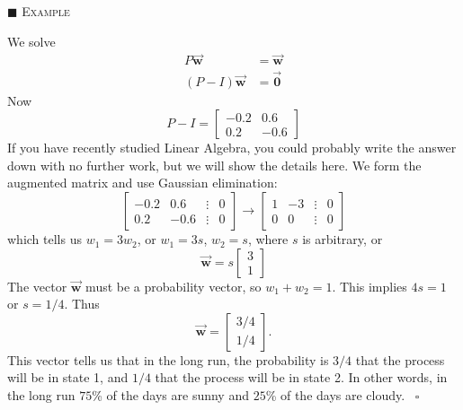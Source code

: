 \documentclass[reqno]{immbook}
\newcommand{\BW}{\vec{\textbf{w}}}
\newcommand{\BZero}{\vec{\textbf{0}}}  %
\numberwithin{equation}{chapter}
\numberwithin{question}{section}
\numberwithin{theorem}{chapter}
\numberwithin{figure}{chapter}
\theoremstyle{definition}
\newenvironment{xexample}%
{%

\medskip\noindent\addtocounter{example}{1}$\blacksquare$ \textsc{Example \theexample}\hspace*{1em}%
}%
{%
~\hfill$\square$

\medskip
}
\begin{document}
\begin{xexample}
We solve
\begin{equation}
\begin{split}
   P\BW & = \BW \\
   (P-I)\BW & = \BZero
\end{split}
\end{equation}
Now
\begin{equation}
  P-I = \begin{bmatrix}
            -0.2 &  0.6 \\
	     0.2 & -0.6
        \end{bmatrix}
\end{equation}
If you have recently studied Linear Algebra, you could probably
write the answer down with no further work, but we will
show the details here.
We form the augmented matrix and use Gaussian elimination:
\begin{equation}
\begin{bmatrix}
   -0.2 &  0.6 & \vdots & 0 \\
    0.2 & -0.6 & \vdots & 0
\end{bmatrix}
\rightarrow
\begin{bmatrix}
   1 & -3 & \vdots & 0 \\
   0 &  0 & \vdots & 0
\end{bmatrix}
\end{equation}
which tells us $w_1 = 3w_2$, or $w_1=3s$, $w_2 = s$, where 
$s$ is arbitrary, or
\begin{equation}
   \BW = s\begin{bmatrix} 3 \\ 1 \end{bmatrix}
\end{equation}
The vector $\BW$ must be a probability vector, so $w_1+w_2=1$.
This implies $4s=1$ or $s=1/4$.
Thus
\begin{equation}
   \BW = \begin{bmatrix} 3/4 \\ 1/4 \end{bmatrix}.
\end{equation}
This vector tells us that in the long run,
the probability is $3/4$ that the process will be in state 1,
and $1/4$ that the process will be in state 2.
In other words, in the long run
$75$\% of the days are sunny and $25$\% of the days
are cloudy.
\end{xexample}
%
\end{document}
